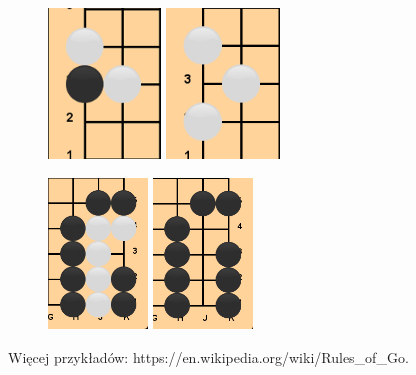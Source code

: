 \documentclass{article}
\begin{document}
\begin{enumerate}
          \begin{figure}[H]
              \centering%
              \begin{minipage}{.48\textwidth}%
                  \centering
                  \includegraphics[height=4cm]{imgs/capture1a.png}
                  \centering
                  \includegraphics[height=4cm]{imgs/capture1b.png}
              \end{minipage}%
          \end{figure}

          \begin{figure}[H]
              \centering%
              \begin{minipage}{.48\textwidth}%
                  \centering
                  \includegraphics[height=4cm]{imgs/capture2a.png}
                  \centering
                  \includegraphics[height=4cm]{imgs/capture2b.png}
              \end{minipage}%
          \end{figure}
          Więcej przykładów: https://en.wikipedia.org/wiki/Rules\_of\_Go.



\end{enumerate}
\end{document}
